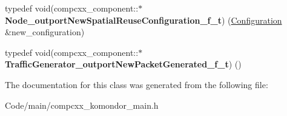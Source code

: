 \begin{DoxyCompactItemize}
\item 
\mbox{\label{classcompcxx__component_a5f94013d79c964e4357a3b0fe6bc6b5e}} 
typedef void(compcxx\+\_\+component\+::$\ast$ {\bfseries Node\+\_\+outport\+New\+Spatial\+Reuse\+Configuration\+\_\+f\+\_\+t}) (\hyperlink{structConfiguration}{Configuration} \&new\+\_\+configuration)
\item 
\mbox{\label{classcompcxx__component_a51b3469f64029d17b27e951265aa146b}} 
typedef void(compcxx\+\_\+component\+::$\ast$ {\bfseries Traffic\+Generator\+\_\+outport\+New\+Packet\+Generated\+\_\+f\+\_\+t}) ()
\end{DoxyCompactItemize}


The documentation for this class was generated from the following file\+:\begin{DoxyCompactItemize}
\item 
Code/main/compcxx\+\_\+komondor\+\_\+main.\+h\end{DoxyCompactItemize}
